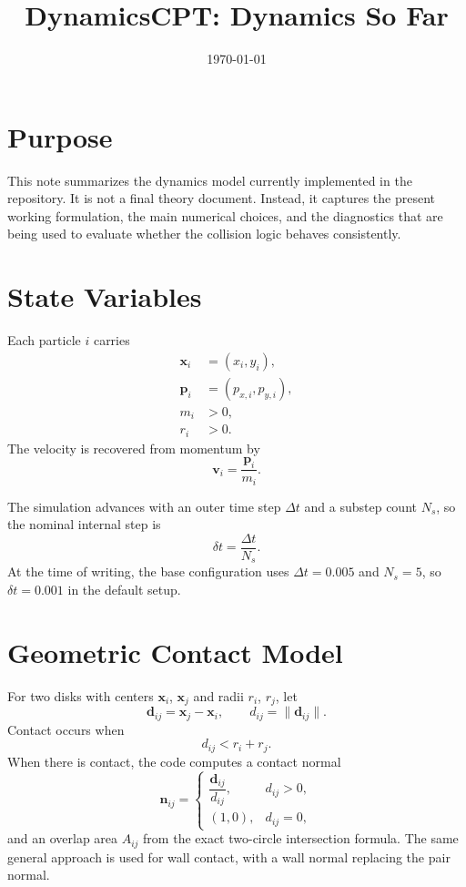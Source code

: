 \documentclass[11pt]{article}
\title{DynamicsCPT: Dynamics So Far}
\author{}
\date{\today}
\begin{document}
\maketitle

\section{Purpose}
This note summarizes the dynamics model currently implemented in the repository. It is not a final theory document. Instead, it captures the present working formulation, the main numerical choices, and the diagnostics that are being used to evaluate whether the collision logic behaves consistently.

\section{State Variables}
Each particle $i$ carries
\begin{align*}
    \mathbf{x}_i &= (x_i, y_i), \\
    \mathbf{p}_i &= (p_{x,i}, p_{y,i}), \\
    m_i &> 0, \\
    r_i &> 0.
\end{align*}
The velocity is recovered from momentum by
\[
    \mathbf{v}_i = \frac{\mathbf{p}_i}{m_i}.
\]

The simulation advances with an outer time step $\Delta t$ and a substep count $N_s$, so the nominal internal step is
\[
    \delta t = \frac{\Delta t}{N_s}.
\]
At the time of writing, the base configuration uses $\Delta t = 0.005$ and $N_s = 5$, so $\delta t = 0.001$ in the default setup.

\section{Geometric Contact Model}
For two disks with centers $\mathbf{x}_i$, $\mathbf{x}_j$ and radii $r_i$, $r_j$, let
\[
    \mathbf{d}_{ij} = \mathbf{x}_j - \mathbf{x}_i,
    \qquad
    d_{ij} = \|\mathbf{d}_{ij}\|.
\]
Contact occurs when
\[
    d_{ij} < r_i + r_j.
\]
When there is contact, the code computes a contact normal
\[
    \mathbf{n}_{ij} =
    \begin{cases}
        \dfrac{\mathbf{d}_{ij}}{d_{ij}}, & d_{ij} > 0, \\
        (1,0), & d_{ij} = 0,
    \end{cases}
\]
and an overlap area $A_{ij}$ from the exact two-circle intersection formula. The same general approach is used for wall contact, with a wall normal replacing the pair normal.
\end{document}
